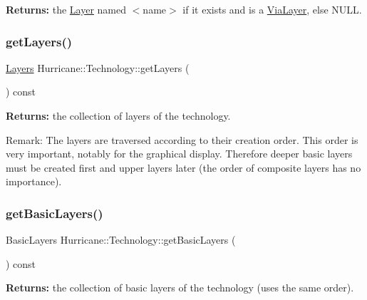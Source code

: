 {\bfseries Returns\+:} the \mbox{\hyperlink{classHurricane_1_1Layer}{Layer}} named {\ttfamily $<$name$>$} if it exists and is a \mbox{\hyperlink{classHurricane_1_1ViaLayer}{Via\+Layer}}, else {\ttfamily N\+U\+LL}. \mbox{\label{classHurricane_1_1Technology_a4e58c5ae8e3e82d7fe1b3bb939d6a633}} 
\subsubsection{\texorpdfstring{get\+Layers()}{getLayers()}}
{\footnotesize\ttfamily \mbox{\hyperlink{namespaceHurricane_a7b7200a36ab7ce8a157ddbe78b625f38}{Layers}} Hurricane\+::\+Technology\+::get\+Layers (\begin{DoxyParamCaption}{ }\end{DoxyParamCaption}) const\hspace{0.3cm}{\ttfamily [inline]}}

{\bfseries Returns\+:} the collection of layers of the technology.

\begin{DoxyParagraph}{Remark\+: The layers are traversed according to their}
creation order. This order is very important, notably for the graphical display. Therefore deeper basic layers must be created first and upper layers later (the order of composite layers has no importance). 
\end{DoxyParagraph}
\mbox{\label{classHurricane_1_1Technology_a7fccff9da6604fafb90408ba56184fc0}} 
\subsubsection{\texorpdfstring{get\+Basic\+Layers()}{getBasicLayers()}\hspace{0.1cm}{\footnotesize\ttfamily [1/2]}}
{\footnotesize\ttfamily Basic\+Layers Hurricane\+::\+Technology\+::get\+Basic\+Layers (\begin{DoxyParamCaption}{ }\end{DoxyParamCaption}) const}

{\bfseries Returns\+:} the collection of basic layers of the technology (uses the same order). \mbox{\label{classHurricane_1_1Technology_a997457824046ea63eba51210a8e23f85}} 
